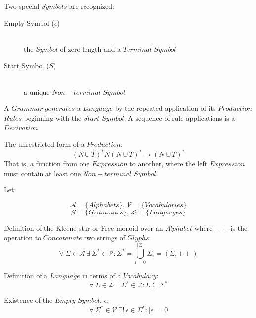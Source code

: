 \documentclass{article}
\begin{document}
Two special $Symbols$ are recognized:

    \begin{description}

    \item[Empty Symbol ($\epsilon$)] \hfill \\
    the $Symbol$ of zero length and a $Terminal$ $Symbol$

    \item[Start Symbol ($S$)] \hfill \\
    a unique $Non-terminal$ $Symbol$

    \end{description}

A $Grammar$ $generates$ a $Language$ by the repeated application
of its $Production$ $Rules$ beginning with the $Start$ $Symbol$. A
sequence of rule applications is a $Derivation$.

The unrestricted form of a $Production$:
\[
    (N \cup T)^*N(N \cup T)^* \rightarrow (N \cup T)^*
\]
That is, a function from one $Expression$ to another, where the left
$Expression$ must contain at least one $Non-terminal$ $Symbol$.

Let:

\[
    \mathcal{A} = \{ Alphabets \},\: \mathcal{V} = \{ Vocabularies \}
\] \[
    \mathcal{G} = \{ Grammars \},\: \mathcal{L} = \{ Languages \}
\]

    \begin{description}

    \item Definition of the Kleene star or Free monoid over an
      $Alphabet$ where $++$ is the operation to $Concatenate$ two
      strings of $Glyphs$:
    \[
        \forall \: \Sigma \in \mathcal{A} \:
        \exists \: \Sigma^* \in \mathcal{V}
        : \Sigma^* = \bigcup_{i=0}^{|\Sigma|} \Sigma_i
        = (\Sigma,++)
    \]

    \item Definition of a $Language$ in terms of a $Vocabulary$:
    \[
        \forall \: L \in \mathcal{L} \:
        \exists \: \Sigma^* \in \mathcal{V}
        : L \subseteq \Sigma^*
    \]

    \item Existence of the $Empty$ $Symbol$, $\epsilon$:
    \[
        \forall \: \Sigma^* \in \mathcal{V} \:
        \exists ! \: \epsilon \in \Sigma^*
        : |\epsilon|=0
    \]

    \end{description}
\end{document}
